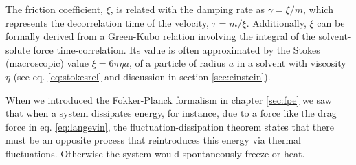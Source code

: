 \documentclass[ twoside,openright,titlepage,numbers=noenddot,%
headinclude,footinclude,cleardoublepage=empty,abstract=on,
BCOR=5mm,paper=a4,fontsize=11pt, dvipsnames
]{scrreprt}
\begin{document}

The friction coefficient, $\xi$, is related with the damping rate as $\gamma = \xi/m$, which represents the decorrelation time of the velocity, $\tau = m/\xi$. Additionally, $\xi$ can be formally derived from a Green-Kubo relation involving the integral of the solvent-solute force time-correlation\cite{Green1954,Kubo1957}. Its value is often approximated by the Stokes (macroscopic) value $\xi=6\pi\eta a$, of a particle of radius $a$ in a solvent with viscosity $\eta$ (see eq. \eqref{eq:stokesrel} and discussion in section \ref{sec:einstein}).

When we introduced the Fokker-Planck formalism in chapter \ref{sec:fpe} we saw that when a system dissipates energy, for instance, due to a force like the drag force in eq. \eqref{eq:langevin}, the fluctuation-dissipation theorem states that there must be an opposite process that reintroduces this energy via thermal fluctuations. Otherwise the system would spontaneously freeze or heat.
\end{document}
